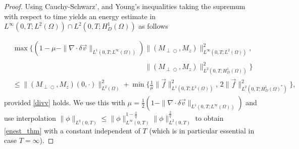\documentclass{ws-m3as}
\def\Mpp{M_{\perp\!\!\!\!\!\bigcirc}}
\newcommand{\revision}[1]{{ #1}}
\newcommand{\Margin}[1]{}
\begin{document}
\begin{proof}
Using Cauchy-Schwarz', and Young's inequalities taking the supremum with respect to time yields an energy estimate in $L^\infty(0,T;L^2(\Omega))\cap L^2(0,T;H_D^1(\Omega))$ as follows
\Margin{R1 2.}
\begin{equation}\label{enest}
\begin{aligned}
&\max\{(1-\mu-\|\nabla\cdot\delta{\vec v}\|_{L^1(0,T;L^\infty(\Omega))}) 
\|(\Mpp,M_z)\|_{L^\infty(0,T;L^2(\Omega))}^2, \,\\
&\phantom{\max\{(1-\mu-\|\nabla\cdot\delta{\vec v}\|_{L^1(0,T;L^\infty(\Omega))})}
\|(\Mpp,M_z)\|_{L^2(0,T;H_D^1(\Omega))}^2\}\\
&\leq \|(\Mpp,M_z)(0, \cdot)\|_{L^2(\Omega)}^2 + \min\{\tfrac{1}{\mu}\|\revision{\vec{f}}\|_{L^1(0,T;L^2(\Omega))}^2, \, 2 \|\revision{\vec{f}}\|_{L^2(0,T;H_D^1(\Omega)^*)}^2\},
\end{aligned}
\end{equation}
provided \eqref{divv} holds. We use this with $\mu=\frac12(1-\|\nabla\cdot\delta{\vec v}\|_{L^1(0,T;L^\infty(\Omega))})$ and use interpolation 
$\|\phi\|_{L^q(0,T)}\leq \|\phi\|_{L^\infty(0,T)}^{1-\frac{2}{q}} \|\phi\|_{L^2(0,T)}^{\frac{2}{q}}$ to obtain \eqref{enest_thm} with a constant independent of $T$ (which is in particular essential in case $T=\infty$).


\end{proof}
\end{document}
